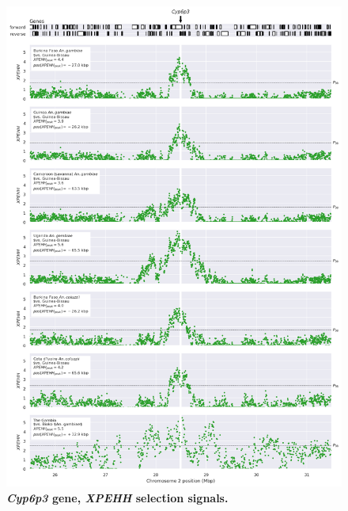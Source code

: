 \documentclass[a4paper,11pt,abstracton,hidelinks]{scrartcl}
\begin{document}
\begin{figure}[t!]
	\begin{center}
		\includegraphics*[width=1\linewidth,center]{artwork/locus_cyp6p3_xpehh_pdist.png}
	\end{center}
	\caption[\textit{Cyp6p3} gene, \textit{XPEHH} selection signals]{
	\textbf{\textit{Cyp6p3} gene, \textit{XPEHH} selection signals.}
	} 
	\label{fig:locus_cyp6p3_xpehh}
\end{figure}
\end{document}
